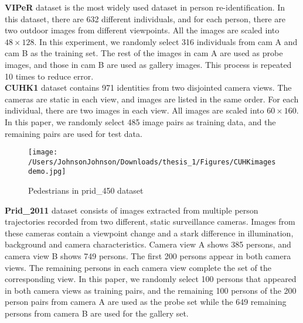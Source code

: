 \noindent \textbf{VIPeR} dataset is the most widely used dataset in person re-identification. In this dataset, there are 632 different individuals, and for each person, there are two outdoor images from different viewpoints. All the images are scaled into $48\times128$. In this experiment, we randomly select 316 individuals from cam A and cam B as the training set. The rest of the images in cam A are used as probe images, and those in cam B are used as gallery images. This process is repeated 10 times to reduce error.\\
\textbf{CUHK1} dataset contains 971 identities from two disjointed camera views. The cameras are static in each view, and images are listed in the same order. For each individual, there are two images in each view. All images are scaled into $60\times160$. In this paper, we randomly select 485 image pairs as training data, and the remaining pairs are used for test data. 
\begin{figure}[H]
\begin{raggedleft}
\texttt{[image: /Users/JohnsonJohnson/Downloads/thesis\_1/Figures/CUHKimagesdemo.jpg]}
\vspace{-3em}
\caption{Pedestrians in prid\_450 dataset}
\end{raggedleft}
\end{figure}
\noindent\textbf{Prid\_2011} dataset consists of images extracted from multiple person trajectories recorded from two different, static surveillance cameras. Images from these cameras contain a viewpoint change and a stark difference in illumination, background and camera characteristics. Camera view A shows 385 persons, and camera view B shows 749 persons. The first 200 persons appear in both camera views. The remaining persons in each camera view complete the set of the corresponding view. In this paper, we randomly select 100 persons that appeared in both camera views as training pairs, and the remaining 100 persons of the 200 person pairs from camera A are used as the probe set while the 649 remaining persons from camera B are used for the gallery set.\\
